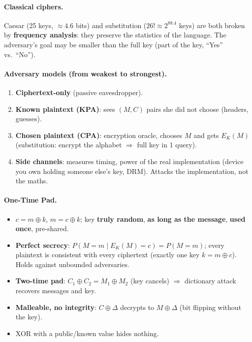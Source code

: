 \paragraph{Classical ciphers.} Caesar (25 keys, $\approx 4.6$ bits) and substitution ($26! \approx 2^{88.4}$ keys) are both broken by \textbf{frequency analysis}: they preserve the statistics of the language. The adversary's goal may be smaller than the full key (part of the key, ``Yes'' vs.\ ``No'').

\paragraph{Adversary models (from weakest to strongest).}
\begin{enumerate}
    \item \textbf{Ciphertext-only} (passive eavesdropper).
    \item \textbf{Known plaintext (KPA)}: sees $(M, C)$ pairs she did not choose (headers, guesses).
    \item \textbf{Chosen plaintext (CPA)}: encryption oracle, chooses $M$ and gets $E_K(M)$ (substitution: encrypt the alphabet $\Rightarrow$ full key in 1 query).
    \item \textbf{Side channels}: measures timing, power of the real implementation (device you own holding someone else's key, DRM). Attacks the implementation, not the maths.
\end{enumerate}

\paragraph{One-Time Pad.}
\begin{itemize}
    \item $c = m \oplus k$, $m = c \oplus k$; key \textbf{truly random}, \textbf{as long as the message}, \textbf{used once}, pre-shared.
    \item \textbf{Perfect secrecy}: $P(M = m \mid E_K(M) = c) = P(M = m)$; every plaintext is consistent with every ciphertext (exactly one key $k = m \oplus c$). Holds against unbounded adversaries.
    \item \textbf{Two-time pad}: $C_1 \oplus C_2 = M_1 \oplus M_2$ (key cancels) $\Rightarrow$ dictionary attack recovers messages and key.
    \item \textbf{Malleable, no integrity}: $C \oplus \Delta$ decrypts to $M \oplus \Delta$ (bit flipping without the key).
    \item XOR with a public/known value hides nothing.
\end{itemize}


